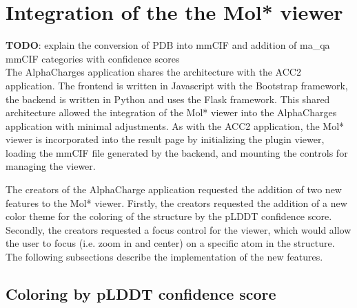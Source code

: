 \documentclass[
  digital,     %
  oneside,     %
  nosansbold,  %
  nocolorbold, %
  lof,         %
  lot,         %
]{fithesis4}
\begin{document}
\section{Integration of the the Mol* viewer}

\textbf{TODO}: explain the conversion of PDB into mmCIF and addition of ma\_qa mmCIF categories with confidence scores \\

The AlphaCharges application shares the architecture with the ACC2 application. The frontend is written in Javascript with the Bootstrap framework, the backend is written in Python and uses the Flask framework. This shared architecture allowed the integration of the Mol* viewer into the AlphaCharges application with minimal adjustments. As with the ACC2 application, the Mol* viewer is incorporated into the result page by initializing the plugin viewer, loading the mmCIF file generated by the backend, and mounting the controls for managing the viewer.

The creators of the AlphaCharge application requested the addition of two new features to the Mol* viewer. Firstly, the creators requested the addition of a new color theme for the coloring of the structure by the pLDDT confidence score. Secondly, the creators requested a focus control for the viewer, which would allow the user to focus (i.e. zoom in and center) on a specific atom in the structure. The following subsections describe the implementation of the new features.



\subsection{Coloring by pLDDT confidence score}
\end{document}
